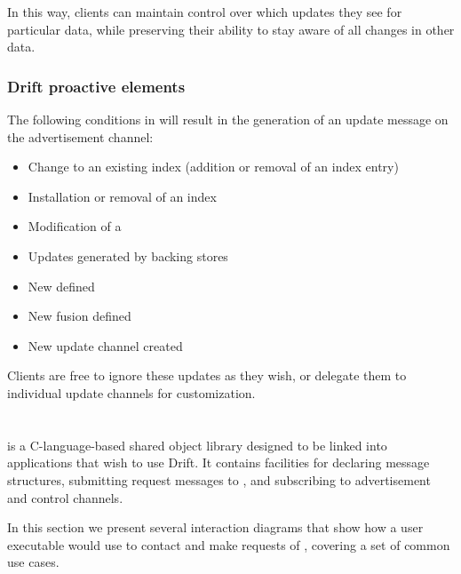 In this way, clients can maintain control over which updates they see for particular data, while
preserving their ability to stay aware of all changes in other data.

\subsubsection{Drift proactive elements}

The following conditions in \driftd will result in the generation of an update message on the
advertisement channel:

\begin{itemize}
\item Change to an existing index (addition or removal of an index entry)
\item Installation or removal of an index
\item Modification of a \dpart
\item Updates generated by backing stores
\item New \dpart defined
\item New \dpart fusion defined
\item New update channel created
\end{itemize}

Clients are free to ignore these updates as they wish, or delegate them to individual update channels for
customization.  


\section{\libdrift}

\libdrift is a C-language-based shared object library designed to be linked into applications that wish
to use Drift.  It contains facilities for declaring message structures, submitting request messages to
\driftd, and subscribing to advertisement and control channels.  

In this section we present several interaction diagrams that show how a user executable would use
\libdrift to contact and make requests of \driftd, covering a set of common use cases.


